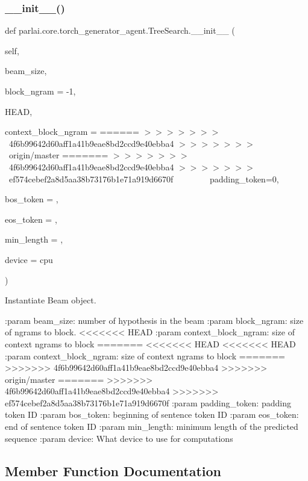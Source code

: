 \subsubsection{\texorpdfstring{\+\_\+\+\_\+init\+\_\+\+\_\+()}{\_\_init\_\_()}}
{\footnotesize\ttfamily def parlai.\+core.\+torch\+\_\+generator\+\_\+agent.\+Tree\+Search.\+\_\+\+\_\+init\+\_\+\+\_\+ (\begin{DoxyParamCaption}\item[{}]{self,  }\item[{}]{beam\+\_\+size,  }\item[{}]{block\+\_\+ngram = {\ttfamily -\/1},  }\item[{}]{H\+E\+AD,  }\item[{}]{context\+\_\+block\+\_\+ngram = {\ttfamily ======
$>$$>$$>$$>$$>$$>$$>$~4f6b99642d60aff1a41b9eae8bd2ccd9e40ebba4
$>$$>$$>$$>$$>$$>$$>$~origin/master
=======
$>$$>$$>$$>$$>$$>$$>$~4f6b99642d60aff1a41b9eae8bd2ccd9e40ebba4
$>$$>$$>$$>$$>$$>$$>$~ef574cebef2a8d5aa38b73176b1e71a919d6670f
~~~~~~~~padding\+\_\+token=0},  }\item[{}]{bos\+\_\+token = {},  }\item[{}]{eos\+\_\+token = {},  }\item[{}]{min\+\_\+length = {},  }\item[{}]{device = {\ttfamily \textquotesingle{}cpu\textquotesingle{}} }\end{DoxyParamCaption})}

\begin{DoxyVerb}Instantiate Beam object.

:param beam_size:
    number of hypothesis in the beam
:param block_ngram:
    size of ngrams to block.
<<<<<<< HEAD
:param context_block_ngram:
    size of context ngrams to block
=======
<<<<<<< HEAD
<<<<<<< HEAD
:param context_block_ngram:
    size of context ngrams to block
=======
>>>>>>> 4f6b99642d60aff1a41b9eae8bd2ccd9e40ebba4
>>>>>>> origin/master
=======
>>>>>>> 4f6b99642d60aff1a41b9eae8bd2ccd9e40ebba4
>>>>>>> ef574cebef2a8d5aa38b73176b1e71a919d6670f
:param padding_token:
    padding token ID
:param bos_token:
    beginning of sentence token ID
:param eos_token:
    end of sentence token ID
:param min_length:
    minimum length of the predicted sequence
:param device:
    What device to use for computations
\end{DoxyVerb}
 

\subsection{Member Function Documentation}
\mbox{\label{classparlai_1_1core_1_1torch__generator__agent_1_1TreeSearch_a9f371e57095af5b22ff5eae4c57326c8}} 
